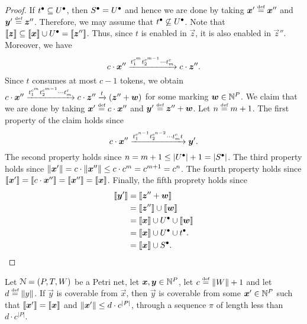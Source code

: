 \begin{proof}
  If ${t^\bullet} \subseteq {U^\bullet}$, then ${S^\bullet} = {U^\bullet}$ and
  hence we are done by taking $\bm{x}' \stackrel{\scriptscriptstyle\text{def}}{=} \bm{x}''$ and
  $\bm{y}' \stackrel{\scriptscriptstyle\text{def}}{=} \bm{z}''$. Therefore, we may assume that ${t^\bullet}
  \not\subseteq {U^\bullet}$. Note that $\llbracket\bm{z}\rrbracket \subseteq
  \llbracket\bm{x}\rrbracket \cup {U^\bullet} = \llbracket\bm{z}''\rrbracket$. Thus, since $t$ is
  enabled in $\vec{z}$, it is also enabled in $\vec{z}''$. Moreover,
  we have $$c \cdot \bm{x}'' \xrightarrow{t_1^{c^m} t_2^{c^{m-1}} \cdots
    t_m^c} c \cdot \bm{z}''.$$ Since $t$ consumes at most $c - 1$
  tokens, we obtain $c \cdot \bm{x}'' \xrightarrow{t_1^{c^m} t_2^{c^{m-1}}
    \cdots t_m^c} c \cdot \bm{z}'' \xrightarrow{t} (\bm{z}'' + \bm{w})$
  for some marking $\bm{w} \in \mathbb{N}^P$.  We claim that we are done by
  taking $\bm{x}' \stackrel{\scriptscriptstyle\text{def}}{=} c \cdot \bm{x}''$ and $\bm{y}' \stackrel{\scriptscriptstyle\text{def}}{=}
  \bm{z}'' + \bm{w}$. Let $n \stackrel{\scriptscriptstyle\text{def}}{=} m + 1$. The first property of
  the claim holds since
  $$c \cdot \bm{x}'' \xrightarrow{t_1^{c^{n-1}} t_2^{c^{n-2}} \cdots t_m^c
    t} \bm{y}'.$$ The second property holds since $n = m + 1 \leq
  |{U^\bullet}| + 1 = |{S^\bullet}|$. The third property holds since
  $\lVert\bm{x}'\rVert = c \cdot \lVert\bm{x}''\rVert \leq c \cdot c^m =
  c^{m+1} = c^n$. The fourth property holds since $\llbracket\bm{x}'\rrbracket =
  \llbracket c \cdot \bm{x}''\rrbracket = \llbracket\bm{x}''\rrbracket =
  \llbracket\bm{x}\rrbracket$. Finally, the fifth proprety holds since
  \begin{align*}
    \llbracket\bm{y}'\rrbracket
    &= \llbracket\bm{z}'' + \bm{w}\rrbracket \\
    &= \llbracket\bm{z}''\rrbracket \cup \llbracket\bm{w}\rrbracket \\
    &= \llbracket\bm{x}\rrbracket \cup {U^\bullet} \cup \llbracket\bm{w}\rrbracket \\ 
    &= \llbracket\bm{x}\rrbracket \cup {U^\bullet} \cup {t^\bullet}. \\ 
    &= \llbracket\bm{x}\rrbracket \cup {S^\bullet}.\qedhere
  \end{align*}
\end{proof}

\begin{corollary}\label{prop:short:cover}
  Let $\mathcal{N} = (P, T, W)$ be a Petri net, let $\bm{x}, \bm{y} \in
  \mathbb{N}^P$, let $c \stackrel{\scriptscriptstyle\text{def}}{=} \lVert W\rVert + 1$ and let $d \stackrel{\scriptscriptstyle\text{def}}{=} \lVert y\rVert$. If
  $\vec{y}$ is coverable from $\vec{x}$, then $\vec{y}$ is coverable
  from some $\bm{x}' \in \mathbb{N}^P$ such that $\llbracket\bm{x}'\rrbracket =
  \llbracket\bm{x}\rrbracket$ and $\lVert\bm{x}'\rVert \leq d \cdot c^{|P|}$, through
  a sequence $\pi$ of length less than $d \cdot c^{|P|}$.
\end{corollary}

